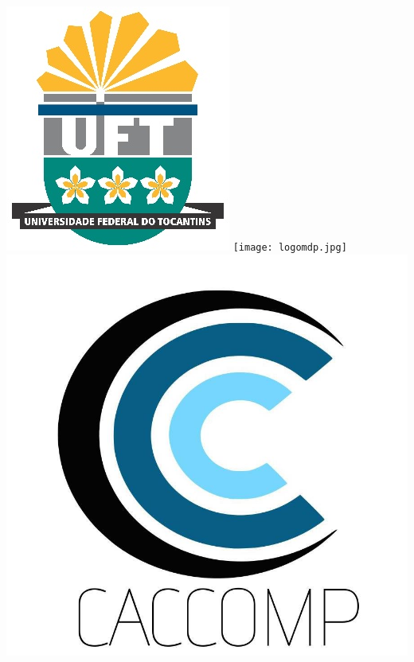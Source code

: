 \documentclass[11pt,oneside,a4paper]{book}
\begin{document}
\begin{titlepage}

\begin{center}
\includegraphics[scale=0.8]{logouft.jpg}
\hspace{3em}
\texttt{[image: logomdp.jpg]}
\hspace{3em}
\includegraphics[scale=0.09]{logocaccomp.jpg}


\end{center}
\end{titlepage}
\end{document}
